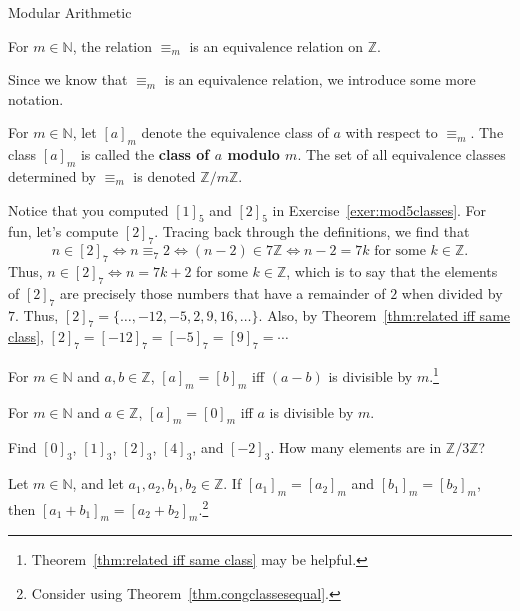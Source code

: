 \begin{section}{Modular Arithmetic}
\begin{theorem}
For  $m\in \mathbb{N}$, the relation $\equiv_m$ is an equivalence relation on $\mathbb{Z}$.
\end{theorem}

Since we know that $\equiv_m$ is an equivalence relation, we introduce some more notation.

\begin{definition}\label{def:modulo}
For  $m\in \mathbb{N}$, let $[a]_m$ denote the equivalence class of $a$ with respect to $\equiv_m$. The class $[a]_m$ is called the \textbf{class of $a$ modulo $m$}. The set of all equivalence classes determined by  $\equiv_m$ is denoted $\mathbb{Z}/m\mathbb{Z}$.
\end{definition}

\begin{example}\label{exam:twomodseven}
Notice that you computed $[1]_5$ and $[2]_5$ in Exercise~\ref{exer:mod5classes}. For fun, let's compute $[2]_7$. 
Tracing back through the definitions, we find that \[n \in [2]_7 \iff n \equiv_7 2 \iff (n-2)\in 7\mathbb{Z} \iff n-2 = 7k \text{ for some $k\in \mathbb{Z}$}.\] Thus, $n \in [2]_7 \iff n = 7k +2$ for some $k\in \mathbb{Z}$, which is to say that the elements of $[2]_7$ are precisely those numbers that have a remainder of $2$ when divided by $7$. Thus, $[2]_7 = \{\ldots,-12,-5,2,9,16,\ldots\}$. Also, by Theorem~\ref{thm:related iff same class}, $[2]_7 = [-12]_7 = [-5]_7 = [9]_7=\cdots$
\end{example}


\begin{theorem}\label{thm.congclassesequal}
For  $m\in \mathbb{N}$ and $a,b\in \mathbb{Z}$, $[a]_m = [b]_m$ iff $(a-b)$ is divisible by $m$.\footnote{Theorem~\ref{thm:related iff same class} may be helpful.} 
\end{theorem}

\begin{theorem}\label{thm.divisibleiffzeromod}
For  $m\in \mathbb{N}$ and $a\in \mathbb{Z}$, $[a]_m = [0]_m$ iff $a$ is divisible by $m$.
\end{theorem}

\begin{exercise}
Find $[0]_3$, $[1]_3$, $[2]_3$, $[4]_3$, and $[-2]_3$. How many elements are in $\mathbb{Z}/3\mathbb{Z}$?
\end{exercise}

\begin{theorem}
Let $m\in \mathbb{N}$, and let $a_1,a_2,b_1,b_2 \in \mathbb{Z}$. If $[a_1]_m = [a_2]_m$ and $[b_1]_m = [b_2]_m$, then $[a_1+b_1]_m = [a_2+b_2]_m$.\footnote{Consider using Theorem~\ref{thm.congclassesequal}.}
\end{theorem}


\end{section}
